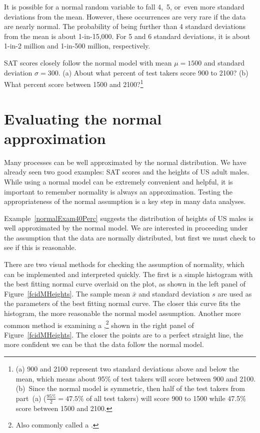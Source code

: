 It is possible for a normal random variable to fall 4,~5, or~even more standard deviations from the mean. However, these occurrences are very rare if the data are nearly normal. The probability of being further than 4 standard deviations from the mean is about 1-in-15,000. For 5 and 6 standard deviations, it is about 1-in-2 million and 1-in-500 million, respectively.

\begin{exercise}
SAT scores closely follow the normal model with mean $\mu = 1500$ and standard deviation $\sigma = 300$. (a) About what percent of test takers score 900 to 2100? (b) What percent score between 1500 and 2100?\footnote{(a) 900 and 2100 represent two standard deviations above and below the mean, which means about 95\% of test takers will score between 900 and 2100. (b)~Since the normal model is symmetric, then half of the test takers from part~(a) ($\frac{95\%}{2} = 47.5\%$ of all test takers) will score 900 to 1500 while 47.5\% score between 1500 and 2100.}
\end{exercise}

\section{Evaluating the normal approximation}
\label{assessingNormal}

Many processes can be well approximated by the normal distribution. We have already seen two good examples: SAT scores and the heights of US adult males. While using a normal model can be extremely convenient and helpful, it is important to remember normality is always an approximation. Testing the appropriateness of the normal assumption is a key step in many data analyses.


Example~\ref{normalExam40Perc} suggests the distribution of heights of US males is well approximated by the normal model. We are interested in proceeding under the assumption that the data are normally distributed, but first we must check to see if this is reasonable.

There are two visual methods for checking the assumption of normality, which can be implemented and interpreted quickly. The first is a simple histogram with the best fitting normal curve overlaid on the plot, as shown in the left panel of Figure~\ref{fcidMHeights}. The sample mean $\bar{x}$ and standard deviation $s$ are used as the parameters of the best fitting normal curve. The closer this curve fits the histogram, the more reasonable the normal model assumption. Another more common method is examining a ,\footnote{Also commonly called a .} shown in the right panel of Figure~\ref{fcidMHeights}. The closer the points are to a perfect straight line, the more confident we can be that the data follow the normal model.

